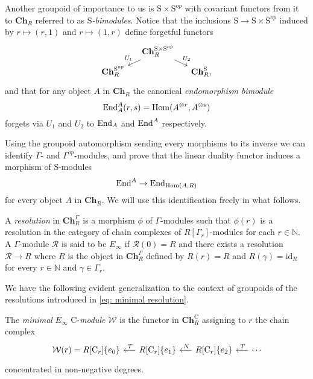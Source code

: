 Another groupoid of importance to us is $\mathrm{S} \times \mathrm{S}^{op}$ with covariant functors from it to $\mathbf{Ch}_R$ referred to as \textit{$\mathrm{S}$-bimodules}.
Notice that the inclusions $\mathrm{S} \to \mathrm{S} \times \mathrm{S}^{op}$ induced by $r \mapsto (r,1)$ and $r \mapsto (1,r)$ define forgetful functors
\begin{equation*}
\begin{tikzcd}[column sep=small, row sep=tiny]
& \mathbf{Ch}_R^{\mathrm{S} \times \mathrm{S}^{op}} \arrow[dl, "U_1"'] \arrow[dr, "U_2"] & \\
\mathbf{Ch}_R^{\mathrm{S}^{op}} & & \mathbf{Ch}_R^{\mathrm{S}},
\end{tikzcd}
\end{equation*}
and that for any object $A$ in $\mathbf{Ch}_R$ the canonical \textit{endomorphism bimodule}
\begin{equation*}
\mathrm{End}_A^A(r, s) = \mathrm{Hom}(A^{\otimes r}, A^{\otimes s})
\end{equation*}
forgets via $U_1$ and $U_2$ to $\mathrm{End}_A$ and $\mathrm{End}^A$ respectively.

Using the groupoid automorphism sending every morphisms to its inverse we can identify $\Gamma$- and $\Gamma^{op}$-modules, and prove that the linear duality functor induces a morphism of $\mathrm{S}$-modules
\begin{equation*}
\mathrm{End}^A \to \mathrm{End}_{\mathrm{Hom}(A, R)}
\end{equation*}
for every object $A$ in $\mathbf{Ch}_R$.
We will use this identification freely in what follows.

A \textit{resolution} in $\mathbf{Ch}_R^\Gamma$ is a morphism $\phi$ of $\Gamma$-modules such that $\phi(r)$ is a resolution in the category of chain complexes of $R[\Gamma_r]$-modules for each $r \in \mathbb{N}$.
A $\Gamma$-module $\mathcal R$ is said to be $E_\infty$ if $\mathcal R(0) = R$ and there exists a resolution $\mathcal R \to \underline{R}$ where $\underline{R}$ is the object in $\mathbf{Ch}_R^\Gamma$ defined by $\underline{R}(r) = R$ and $\underline{R}(\gamma) = \mathrm{id}_R$ for every $r \in \mathbb{N}$ and $\gamma \in \Gamma_r$.

We have the following evident generalization to the context of groupoids of the resolutions introduced in \eqref{eq: minimal resolution}.

\begin{definition} \label{def: minimal cyclic resolution}
	The \textit{minimal} $E_\infty$ $\mathrm{C}$-\textit{module} $\mathcal W$ is the functor in $\mathbf{Ch}_R^\mathrm{C}$ assigning to $r$ the chain complex
	\begin{equation*}
	\begin{tikzcd} [column sep = .5cm]
	\mathcal W(r) = R[\mathrm{C}_r]\{e_0\} & \arrow[l, "\,T"'] R[\mathrm{C}_r]\{e_1\} & \arrow[l, "\,N"'] R[\mathrm{C}_r]\{e_2\} & \arrow[l, "\,T"'] \cdots
	\end{tikzcd}
	\end{equation*}
	concentrated in non-negative degrees.
\end{definition}

